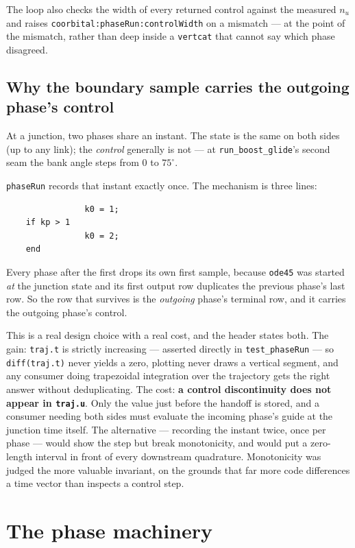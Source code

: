 \documentclass[11pt]{article}
\newcommand{\code}[1]{\texttt{#1}}
\begin{document}
The loop also checks the width of every returned control against the measured
$n_u$ and raises \code{coorbital:phaseRun:controlWidth} on a mismatch --- at
the point of the mismatch, rather than deep inside a \code{vertcat} that
cannot say which phase disagreed.

\subsection{Why the boundary sample carries the outgoing phase's control}

At a junction, two phases share an instant. The state is the same on both
sides (up to any link); the \emph{control} generally is not --- at
\code{run\_boost\_glide}'s second seam the bank angle steps from $0$ to
$75^\circ$.

\code{phaseRun} records that instant exactly once. The mechanism is three
lines:

\begin{lstlisting}
                k0 = 1;
    if kp > 1
                k0 = 2;
    end
\end{lstlisting}

Every phase after the first drops its own first sample, because \code{ode45}
was started \emph{at} the junction state and its first output row duplicates
the previous phase's last row. So the row that survives is the
\emph{outgoing} phase's terminal row, and it carries the outgoing phase's
control.

This is a real design choice with a real cost, and the header states both. The
gain: \code{traj.t} is strictly increasing --- asserted directly in
\code{test\_phaseRun} --- so \code{diff(traj.t)} never yields a zero, plotting
never draws a vertical segment, and any consumer doing trapezoidal integration
over the trajectory gets the right answer without deduplicating. The cost:
\textbf{a control discontinuity does not appear in \code{traj.u}}. Only the
value just before the handoff is stored, and a consumer needing both sides must
evaluate the incoming phase's guide at the junction time itself. The
alternative --- recording the instant twice, once per phase --- would show the
step but break monotonicity, and would put a zero-length interval in front of
every downstream quadrature. Monotonicity was judged the more valuable
invariant, on the grounds that far more code differences a time vector than
inspects a control step.

\section{The phase machinery}
\label{sec:phase}
\end{document}
